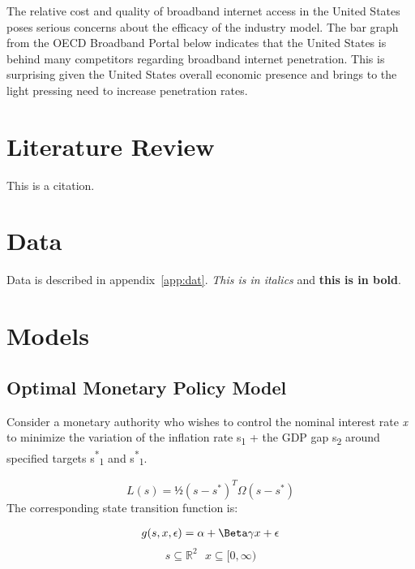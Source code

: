 \documentclass[a4paper,oneside]{article}
\begin{document}
The relative cost and quality of broadband internet access in the United States poses
serious concerns about the efficacy of the industry model. The bar graph from the OECD
Broadband Portal below indicates that the United States is behind many competitors regarding
broadband internet penetration. This is surprising given the United States overall economic
presence and brings to the light pressing need to increase penetration rates.

\section{Literature Review}

\citep{Dixit_1989} This is a citation.

\section{Data}

Data is described in appendix~\ref{app:dat}. \textit{This is in italics} and \textbf{this is in bold}.

\section{Models}
\subsection{Optimal Monetary Policy Model}

\:\:\:\:\:\:\:\:Consider a monetary authority who wishes to control the nominal interest rate  \emph{x} to minimize the variation of the inflation rate s\textsubscript{1} + the GDP gap s\textsubscript{2} around specified targets s\textsuperscript{*}\textsubscript{1} and s\textsuperscript{*}\textsubscript{1}.

\begin{equation}
	L(s) = ½(s-s^{*})^{T}\Omega(s-s^{*})
	\label{eq:mye1}
\end{equation} 
The corresponding state transition function is: 

\begin{equation}
\begin{aligned}
	g(s,x,\epsilon) = \alpha + \Beta \gamma x + \epsilon
	\label{eq:myeq2} 
\end{aligned}\end{equation}
\begin{equation*}
s \subseteq \mathbb{R}^{2} \:\:\:	
x \subseteq [0, \infty)
\end{equation*}
\end{document}
